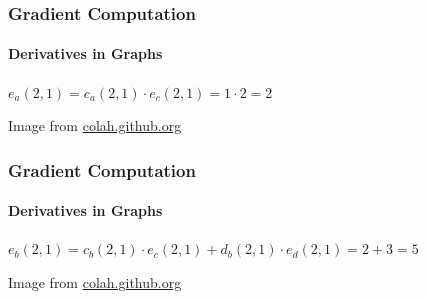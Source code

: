\documentclass[xetex,professionalfont]{beamer}
\begin{document}
\begin{frame}
\frametitle{Gradient Computation}
\framesubtitle{Derivatives in Graphs}

$e_a(2,1)=c_a(2,1)\cdot e_c(2,1)=1\cdot 2=2$


\medskip

\begin{center}
    {\centering Image from \href{https://colah.github.io/posts/2015-08-Backprop/}{colah.github.org}}
\end{center}

\end{frame}


\begin{frame}
\frametitle{Gradient Computation}
\framesubtitle{Derivatives in Graphs}

$e_b(2,1)=c_b(2,1)\cdot e_c(2,1)+ d_b(2,1)\cdot e_d(2,1)=2+3=5$

\medskip

\begin{center}
    {\centering Image from \href{https://colah.github.io/posts/2015-08-Backprop/}{colah.github.org}}
\end{center}

\end{frame}
\end{document}

